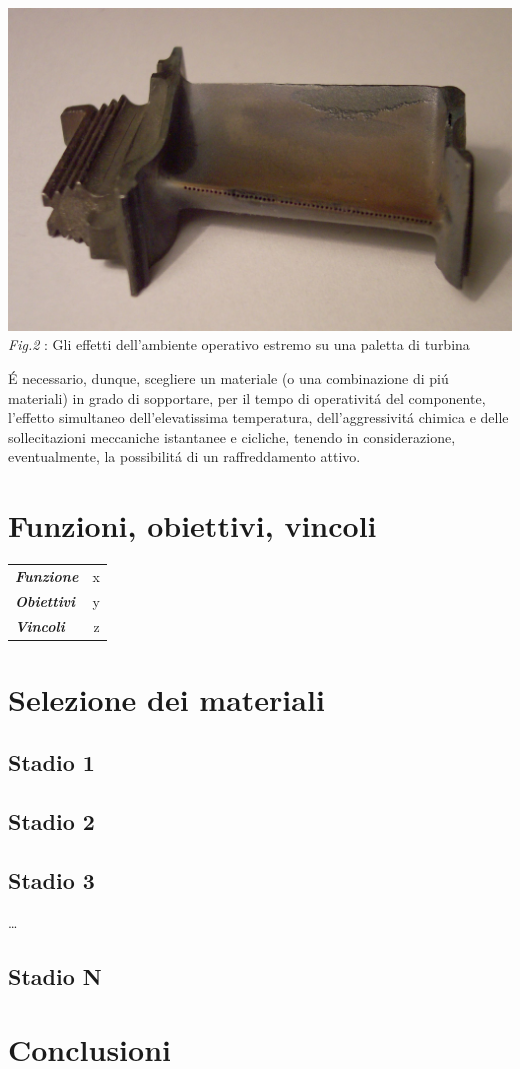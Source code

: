 \documentclass{article}
\begin{document}
    \begin{center}
        \includegraphics[width=\textwidth]{Sources/Turbinenschaufel_RB199.jpg}
        \textit{Fig.2 }: Gli effetti dell'ambiente operativo estremo su una paletta di turbina \autocite*{turbine_blade}
    \end{center}
    É necessario, dunque, scegliere un materiale (o una combinazione di piú materiali)
    in grado di sopportare, per il tempo di operativitá del componente, l'effetto
    simultaneo dell'elevatissima temperatura, dell'aggressivitá chimica e delle sollecitazioni meccaniche istantanee e cicliche,
     tenendo in considerazione, eventualmente, la possibilitá di un raffreddamento attivo.\\

    \pagebreak




    \section{Funzioni, obiettivi, vincoli}
        \begin{tabular}{l|r}
            \toprule
                \textbf{\textit{Funzione}}   & x\\
                \textbf{\textit{Obiettivi}}  & y\\ 
                \textbf{\textit{Vincoli}}    & z\\ 
            \bottomrule
        \end{tabular}   
    \section{Selezione dei materiali}
        \subsection{Stadio 1}
        \subsection{Stadio 2}
        \subsection{Stadio 3}
        \dots
        \subsection{Stadio N}
    \section{Conclusioni}
    
    \printbibliography
    
\end{document}
